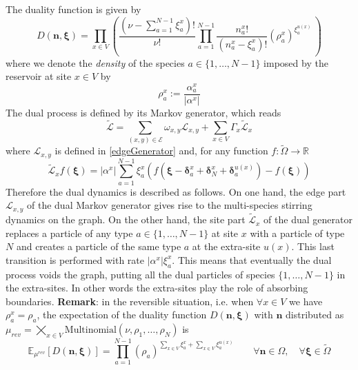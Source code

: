 \documentclass[10pt]{article}
\numberwithin{equation}{section}
\numberwithin{equation}{subsection}
\newcommand{\twoj}{\nu}
\begin{document}
The duality function is given by
\begin{equation}\label{dualityElements}
	D(\bm{n},\bm{\xi})=\prod_{x\in V}\left(\frac{(\nu -\sum_{a=1}^{N-1}\xi_{a}^{x})!}{\nu!}\prod_{a=1}^{N-1}\frac{n_{a}^{x}!}{(n_{a}^{x}-\xi_{a}^{x})!}\left(\rho_{a}^{x}\right)^{\xi_{a}^{u(x)}}\,\right)
\end{equation}
where we denote the \textit{density} of the species $a\in \{1,\ldots,N-1\}$ imposed by the reservoir at site $x\in V$  by 
\begin{equation}
\rho_{a}^{x}:=\frac{\alpha_{a}^{x}}{|\alpha^{x}|}
\end{equation}
The dual process is defined by its Markov generator, which reads
 \begin{equation}\label{DualGenerator}
    \widetilde{\mathcal{L}}=\sum_{(x,y)\in \mathcal{E}}\omega_{x,y}\mathcal{L}_{x,y}+\sum_{x\in V}\Gamma_{x}\widetilde{\mathcal{L}}_{x}
\end{equation}
where 
$\mathcal{L}_{x,y}$ is defined in \eqref{edgeGenerator} and, for any function $f:\widetilde{\Omega}\to \mathbb{R}$ 
\begin{equation}\label{siteDualGenerator}
    \widetilde{\mathcal{L}}_{x}f(\bm{\xi})=|\alpha^{x}|\sum_{a=1}^{N-1}\xi_{a}^{x}\left(f(\bm{\xi}-\bm{\delta}_{a}^{x}+\bm{\delta}_{N}^{x}+\bm{\delta}_{a}^{u(x)})-f(\bm{\xi})\right)
\end{equation}
\newline
Therefore the dual dynamics is described as follows. On one hand, the edge part $\mathcal{L}_{x,y}$ of the dual Markov generator gives rise to  the multi-species stirring dynamics on the graph. On the other hand, the site
part $\widetilde{\mathcal{L}}_{x}$ of the dual generator replaces a particle of any type $a\in\{1,\ldots,N-1\}$ at site $x$ with a particle of type $N$ and creates a particle of the same type $a$ at the extra-site $u(x)$. This last transition is performed with rate $|\alpha^{x}|\xi_{a}^{x}$. This means that eventually the dual process voids the graph, putting all the dual particles of species $\{1,\ldots,N-1\}$ in the extra-sites. In other words the extra-sites play the role of absorbing boundaries. 
\newline \newline
\textbf{Remark}: in the reversible situation, i.e. when $\forall x\in V$ we have $\rho_{a}^{x}=\rho_{a}$, the expectation  of the duality function  $D(\bm{n},\bm{\xi})$ with   $\bm{n}$ distributed as  $\mu_{rev} = \bigtimes_{x\in V}\text{Multinomial}\left(\twoj, \rho_{1},\ldots,\rho_{N}\right)$ is
\begin{equation}
\mathbb{E}_{\mu^{rev}}\left[D(\bm{n},\bm{\xi})\right]=\prod_{a=1}^{N-1}\left(\rho_{a}\right)^{\sum_{x\in V}\xi_{a}^{x}+\sum_{x\in V}\xi_{a}^{u(x)}}\qquad \forall \bm{n}\in \Omega,\quad\forall \bm{\xi}\in \widetilde{\Omega}
\end{equation}
\end{document}
